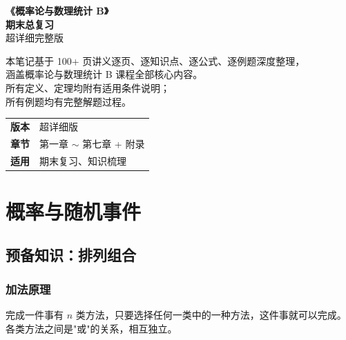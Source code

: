 \documentclass[12pt, a4paper]{article}
\begin{document}
\begin{titlepage}
    \centering
    \vspace*{2cm}
    {\Huge\bfseries\color{mainblue}《概率论与数理统计 B》}\\[0.6cm]
    {\huge\bfseries\color{sectionred}期末总复习}\\[0.4cm]
    {\Large\color{gray}超详细完整版}\\[2cm]
    \begin{tcolorbox}[
            width=0.85\textwidth, colback=lightblue, colframe=mainblue,
            arc=8pt, left=12pt, right=12pt, top=10pt, bottom=10pt
        ]
        \centering\normalsize
        本笔记基于 100+ 页讲义逐页、逐知识点、逐公式、逐例题深度整理，\\
        涵盖概率论与数理统计 B 课程全部核心内容。\\[4pt]
        所有定义、定理均附有适用条件说明；\\
        所有例题均有完整解题过程。
    \end{tcolorbox}
    \vfill
    \begin{tabular}{ll}
        \textbf{版本} & 超详细版                \\[2pt]
        \textbf{章节} & 第一章 $\sim$ 第七章 + 附录 \\[2pt]
        \textbf{适用} & 期末复习、知识梳理
    \end{tabular}
    \vspace{1.5cm}
\end{titlepage}

\tableofcontents
\newpage

\section{概率与随机事件}

\subsection{预备知识：排列组合}

\subsubsection{加法原理}

完成一件事有 $n$ 类方法，只要选择任何一类中的一种方法，这件事就可以完成。
各类方法之间是"或"的关系，相互独立。
\end{document}
